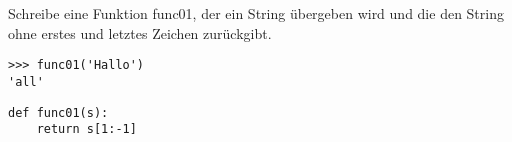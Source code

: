 \question[2] Schreibe eine Funktion func01, der ein String übergeben wird und
die den String ohne erstes und letztes Zeichen zurückgibt.
\begin{lstlisting}
>>> func01('Hallo')
'all'
\end{lstlisting}
\begin{solutionbox}{4cm}
\begin{lstlisting}
def func01(s):
    return s[1:-1]
\end{lstlisting}
\end{solutionbox}
